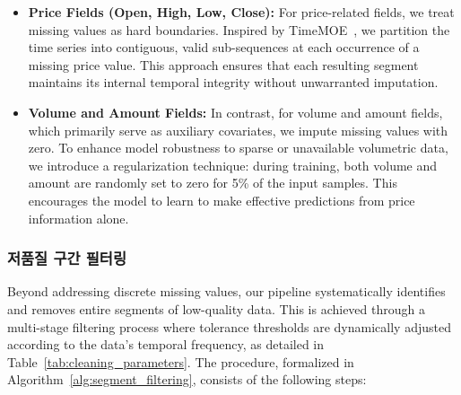 \begin{itemize}
    \item \textbf{Price Fields (Open, High, Low, Close):} For price-related fields, we treat missing values as hard boundaries. Inspired by TimeMOE~\cite{xiaoming2025time}, we partition the time series into contiguous, valid sub-sequences at each occurrence of a missing price value. This approach ensures that each resulting segment maintains its internal temporal integrity without unwarranted imputation.
    \item \textbf{Volume and Amount Fields:} In contrast, for volume and amount fields, which primarily serve as auxiliary covariates, we impute missing values with zero. To enhance model robustness to sparse or unavailable volumetric data, we introduce a regularization technique: during training, both volume and amount are randomly set to zero for 5\% of the input samples. This encourages the model to learn to make effective predictions from price information alone.
\end{itemize}

\subsubsection{저품질 구간 필터링}
Beyond addressing discrete missing values, our pipeline systematically identifies and removes entire segments of low-quality data. This is achieved through a multi-stage filtering process where tolerance thresholds are dynamically adjusted according to the data's temporal frequency, as detailed in Table~\ref{tab:cleaning_parameters}. The procedure, formalized in Algorithm~\ref{alg:segment_filtering}, consists of the following steps:

